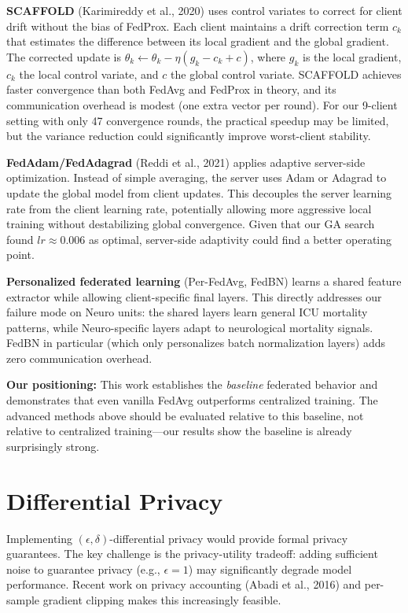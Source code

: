 \documentclass[11pt,a4paper]{report}
\begin{document}
\textbf{SCAFFOLD} (Karimireddy et al., 2020) uses control variates to correct for client drift without the bias of FedProx. Each client maintains a drift correction term $c_k$ that estimates the difference between its local gradient and the global gradient. The corrected update is $\theta_k \leftarrow \theta_k - \eta(g_k - c_k + c)$, where $g_k$ is the local gradient, $c_k$ the local control variate, and $c$ the global control variate. SCAFFOLD achieves faster convergence than both FedAvg and FedProx in theory, and its communication overhead is modest (one extra vector per round). For our 9-client setting with only 47 convergence rounds, the practical speedup may be limited, but the variance reduction could significantly improve worst-client stability.

\textbf{FedAdam/FedAdagrad} (Reddi et al., 2021) applies adaptive server-side optimization. Instead of simple averaging, the server uses Adam or Adagrad to update the global model from client updates. This decouples the server learning rate from the client learning rate, potentially allowing more aggressive local training without destabilizing global convergence. Given that our GA search found $lr \approx 0.006$ as optimal, server-side adaptivity could find a better operating point.

\textbf{Personalized federated learning} (Per-FedAvg, FedBN) learns a shared feature extractor while allowing client-specific final layers. This directly addresses our failure mode on Neuro units: the shared layers learn general ICU mortality patterns, while Neuro-specific layers adapt to neurological mortality signals. FedBN in particular (which only personalizes batch normalization layers) adds zero communication overhead.

\textbf{Our positioning:} This work establishes the \emph{baseline} federated behavior and demonstrates that even vanilla FedAvg outperforms centralized training. The advanced methods above should be evaluated relative to this baseline, not relative to centralized training---our results show the baseline is already surprisingly strong.

\section{Differential Privacy}

Implementing $(\epsilon, \delta)$-differential privacy would provide formal privacy guarantees. The key challenge is the privacy-utility tradeoff: adding sufficient noise to guarantee privacy (e.g., $\epsilon = 1$) may significantly degrade model performance. Recent work on privacy accounting (Abadi et al., 2016) and per-sample gradient clipping makes this increasingly feasible.
\end{document}
